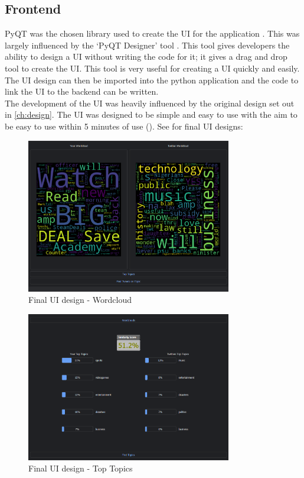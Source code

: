 \subsection{Frontend}
PyQT was the chosen library used to create the UI for the application \cite{pyqt}. This was largely influenced by the `PyQT Designer' tool \cite{pyqt}. This tool gives
developers the ability to design a UI without writing the code for it; it gives a drag and drop tool to create the UI. This tool is very useful
for creating a UI quickly and easily. The UI design can then be imported into the python application and the code to link the UI to the backend
can be written.\\
The development of the UI was heavily influenced by the original design set out in \cref{ch:design}. The UI was designed to be simple and easy to use
with the aim to be easy to use within 5 minutes of use (). See  for final UI designs:
\begin{figure}[hbtp]
    \centering
    \includegraphics[width=0.8\textwidth]{../images/UI-dark-1-wc.png}
    \caption{Final UI design - Wordcloud}
    \label{fig:ui-wordcloud}
\end{figure}
\begin{figure}[hbtp]
    \centering
    \includegraphics[width=0.8\textwidth]{../images/UI-dark-1-tt.png}
    \caption{Final UI design - Top Topics}
    \label{fig:ui-toptopics}
\end{figure}
